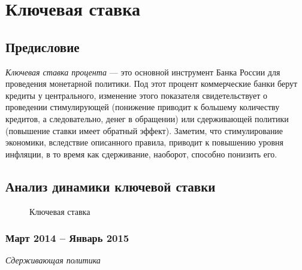\section{Ключевая ставка}
\subsection{Предисловие}
\noindent
\textit{Ключевая ставка процента} — это основной инструмент Банка России для проведения монетарной политики. Под этот процент коммерческие банки берут кредиты у центрального, изменение этого показателя свидетельствует о проведении стимулирующей (понижение приводит к большему количеству кредитов, а следовательно, денег в обращении) или сдерживающей политики (повышение ставки имеет обратный эффект). Заметим, что стимулирование экономики, вследствие описанного правила, приводит к повышению уровня инфляции, в то время как сдерживание, наоборот, способно понизить его.
\subsection{Анализ динамики ключевой ставки \cite{press_release}}

\begin{figure}[H]
\centering
{}
\caption{Ключевая ставка \cite{interest_rate}}
\end{figure}

\newpage
\subsubsection*{Март 2014 – Январь 2015}
\noindent
\emph{Сдерживающая политика}

